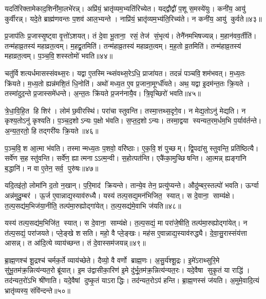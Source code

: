 यदति॑रिक्तामेकाद॒शिनी॑मा॒लभे॑रन्न्। अप्रि॑यं॒ भ्रातृ॑व्यम॒भ्यति॑रिच्येत। यद्द्वौद्वौ॑ प॒शू स॒मस्ये॑युः। कनी॑य॒ आयु॑ कुर्वीरन्न्। यदे॒ते ब्राह्म॑णवन्तः प॒शव॑ आल॒भ्यन्ते। नाप्रि॑यं॒ भ्रातृ॑व्यम॒भ्य॑ति॒रिच्य॑ते। न कनी॑य॒ आयु॑ कुर्वते॥४३॥\anuvakamend[ते ए॒वाल॑भन्ते मैत्रावरु॒णीमाल॑भ॒न्तेऽव॑रुद्ध्यै स॒प्त च॑]

प्र॒जाप॑तिः प्र॒जास्सृ॒ष्ट्वा वृ॒त्तो॑ऽशयत्। तं दे॒वा भू॒ताना॒ रसं॒ तेज॑ सं॒भृत्य॑। तेनै॑नमभिषज्यन्न्। म॒हान॑वव॒र्तीति॑। तन्म॑हाव्र॒तस्य॑ महाव्रत॒त्वम्। म॒हद्व्र॒तमिति॑। तन्म॑हाव्र॒तस्य॑ महाव्रत॒त्वम्। म॒ह॒तो व्र॒तमिति॑। तन्म॑हाव्र॒तस्य॑ महाव्रत॒त्वम्। प॒ञ्च॒वि॒शस्स्तोमो॑ भवति॥४४॥

चतु॑र्विशत्यर्धमासस्संवथ्स॒रः। यद्वा ए॒तस्मिन्थ्संवथ्स॒रेऽधि॒ प्राजा॑यत। तदन्नं॑ पञ्चवि॒शम॑भवत्। म॒ध्य॒तः क्रि॑यते। म॒ध्य॒तो ह्यन्न॑मशि॒तं धि॒नोति॑। अथो॑ मध्य॒त ए॒व प्र॒जाना॒मूर्ग्धी॑यते। अथ॒ यद्वा इ॒दम॑न्त॒तः क्रि॒यते। तस्मा॑दुद॒न्ते प्र॒जास्समे॑धन्ते। अ॒न्त॒तः क्रि॑यते प्र॒जन॑नायै॒व। त्रि॒वृच्छिरो॑ भवति॥४५॥

त्रे॒धा॒वि॒हि॒त हि शिर॑। लोम॑ छ॒वीरस्थि॑। परा॑चा स्तुवन्ति। तस्मा॒त्तथ्स॒दृगे॒व। न मेद्य॒तोऽनु॑ मेद्यति। न कृश्य॒तोऽनु॑ कृश्यति। प॒ञ्च॒द॒शोऽन्यः प॒क्षो भ॑वति। स॒प्त॒द॒शोऽन्यः। तस्मा॒द्वया स्यन्यत॒रम॒र्धम॒भि प॒र्याव॑र्तन्ते। अ॒न्य॒त॒रतो॒ हि तद्गरी॑यः क्रि॒यते॥४६॥

प॒ञ्च॒वि॒श आ॒त्मा भ॑वति। तस्मान्मध्य॒तः प॒शवो॒ वरि॑ष्ठाः। ए॒क॒वि॒शं पुच्छम्। द्वि॒पदा॑सु स्तुवन्ति॒ प्रति॑ष्ठित्यै। सर्वे॑ण स॒ह स्तु॑वन्ति। सर्वे॑ण॒ ह्यात्मनाऽऽत्म॒न्वी। स॒होत्पत॑न्ति। एकै॑का॒मुच्छिषन्ति। आ॒त्मन्न् ह्यङ्गा॑नि ब॒द्धानि॑। न वा ए॒तेन॒ सर्व॒ पुरु॑षः॥४७॥

यदि॒तइ॑तो॒ लोमा॑नि द॒तो न॒खान्। प॒रि॒माद॑ क्रियन्ते। तान्ये॒व तेन॒ प्रत्यु॑प्यन्ते। औदु॑म्बर॒स्तल्पो॑ भवति। ऊर्ग्वा अन्न॑मुदु॒म्बर॑। ऊ॒र्ज ए॒वान्नाद्य॒स्याव॑रुध्यै। यस्य॑ तल्प॒सद्य॒मन॑भिजित॒ स्यात्। स दे॒वाना॒ साम्य॑क्षे। त॒ल्प॒सद्य॑म॒भिज॑या॒नीति॒ तल्प॑मा॒रुह्योद्गा॑येत्। त॒ल्प॒सद्य॑मे॒वाभि ज॑यति॥४८॥

यस्य॑ तल्प॒सद्य॑म॒भिजि॑त॒ स्यात्। स दे॒वाना॒ साम्य॑क्षे। त॒ल्प॒सद्यं॒ मा परा॑जे॒षीति॒ तल्प॑मा॒रुह्योद्गा॑येत्। न त॑ल्प॒सद्यं॒ परा॑जयते। प्ले॒ङ्खे शसति। महो॒ वै प्ले॒ङ्खः। मह॑स ए॒वान्नाद्य॒स्याव॑रुद्ध्यै। दे॒वा॒सु॒रास्संय॑त्ता आसन्न्। त आ॑दि॒त्ये व्याय॑च्छन्त। तं दे॒वास्सम॑जयन्न्॥४९॥

ब्रा॒ह्म॒णश्च॑ शू॒द्रश्च॑ चर्मक॒र्ते व्याय॑च्छेते। दैव्यो॒ वै वर्णो ब्राह्म॒णः। अ॒सु॒र्य॑श्शू॒द्रः। इ॒मे॑ऽराथ्सुरि॒मे सु॑भू॒तम॑क्र॒न्नित्य॑न्यत॒रो ब्रू॑यात्। इ॒म उ॑द्वासीका॒रिण॑ इ॒मे दु॑र्भू॒तम॑क्र॒न्नित्य॑न्यत॒रः। यदे॒वैषा सुकृ॒तं या राद्धि॑। तद॑न्यत॒रो॑ऽभि श्री॑णाति। यदे॒वैषां दुष्कृ॒तं याऽराद्धिः। तद॑न्यत॒रोऽप॑ हन्ति। ब्रा॒ह्म॒णस्सं ज॑यति। अ॒मुमे॒वादि॒त्यं भ्रातृ॑व्यस्य॒ संवि॑न्दन्ते॥५०॥

